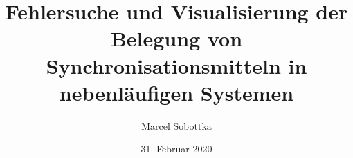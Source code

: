 \title{Fehlersuche und Visualisierung der Belegung von Synchronisationsmitteln
in nebenläufigen Systemen}
\author{Marcel Sobottka}
\date{31. Februar 2020}
\publishers{Betreuer: Marcel Schaible}

\maketitle